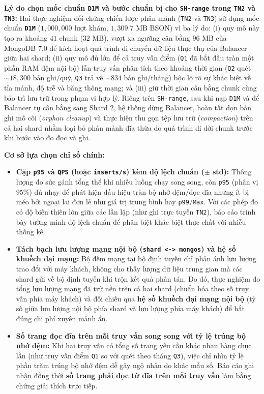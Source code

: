 \textbf{Lý do chọn mốc chuẩn \texttt{D1M} và bước chuẩn bị cho \texttt{SH-range} trong \texttt{TN2} và \texttt{TN3}:} Hai thực nghiệm đối chứng chiến lược phân mảnh (\texttt{TN2} và \texttt{TN3}) sử dụng mốc chuẩn \textbf{\texttt{D1M}} ($1{,}000{,}000$ lượt khám, $1{,}309.7\text{ MB}$ BSON) vì ba lý do: (i) quy mô này tạo ra khoảng $41$ chunk ($32\text{ MB}$), vượt xa ngưỡng cân bằng $96\text{ MB}$ của MongoDB 7.0 để kích hoạt quá trình di chuyển dữ liệu thực thụ của Balancer giữa hai shard; (ii) quy mô đủ lớn để cả truy vấn điểm (\texttt{Q1} đã bắt đầu tràn một phần RAM đệm nội bộ) lẫn truy vấn phân tích theo khoảng thời gian (\texttt{Q2} quét $\sim 18{,}300$ bản ghi/quý, \texttt{Q3} trả về $\sim 834$ bản ghi/tháng) bộc lộ rõ sự khác biệt về tỉa mảnh, độ trễ và băng thông mạng; và (iii) giữ thời gian cân bằng chunk cùng bảo trì lưu trữ trong phạm vi hợp lý. Riêng trên \texttt{SH-range}, sau khi nạp \texttt{D1M} và để Balancer tự cân bằng sang Shard 2, hệ thống dừng Balancer, hoàn tất dọn bản ghi mồ côi (\textit{orphan cleanup}) và thực hiện thu gọn tệp lưu trữ (\textit{compaction}) trên cả hai shard nhằm loại bỏ phân mảnh đĩa thừa do quá trình di dời chunk trước khi bước vào đo đọc và ghi.

\textbf{Cơ sở lựa chọn chỉ số chính:}
\begin{itemize}[leftmargin=0.8cm, itemsep=4pt]
  \item \textbf{Cặp \texttt{p95} và \texttt{QPS} (hoặc \texttt{inserts/s}) kèm độ lệch chuẩn ($\pm$ std):} Thông lượng đo sức gánh tổng thể khi nhiều luồng chạy song song, còn \texttt{p95} (phân vị $95\%$) đủ nhạy để phát hiện dấu hiệu tràn bộ nhớ đệm/đọc đĩa nhưng ít bị méo bởi ngoại lai đơn lẻ như giá trị trung bình hay \texttt{p99}/\texttt{Max}. Với các phép đo có độ biến thiên lớn giữa các lần lặp (như ghi trực tuyến \texttt{TN2}), báo cáo trình bày tường minh độ lệch chuẩn để phân biệt khác biệt thực chất với nhiễu thống kê.
  \item \textbf{Tách bạch lưu lượng mạng nội bộ (\texttt{shard <-> mongos}) và hệ số khuếch đại mạng:} Bộ đếm mạng tại bộ định tuyến chỉ phản ánh lưu lượng trao đổi với máy khách, không cho thấy lượng dữ liệu trung gian mà các shard gửi về bộ định tuyến khi trộn kết quả phân tán. Do đó, thực nghiệm đo tổng lưu lượng mạng đã trừ nền trên cả hai shard (chuẩn hóa theo số truy vấn phía máy khách) và đối chiếu qua \textbf{hệ số khuếch đại mạng nội bộ} (tỷ số giữa lưu lượng nội bộ phía shard và lưu lượng phía máy khách) để bắt đúng chi phí xuyên mảnh ẩn.
  \item \textbf{Số trang đọc đĩa trên mỗi truy vấn song song với tỷ lệ trúng bộ nhớ đệm:} Khi hai truy vấn có tổng số trang yêu cầu khác nhau hàng chục lần (như truy vấn điểm \texttt{Q1} so với quét theo tháng \texttt{Q3}), việc chỉ nhìn tỷ lệ phần trăm trúng bộ nhớ đệm dễ gây ngộ nhận do khác mẫu số. Báo cáo ghi nhận đồng thời \textbf{số trang phải đọc từ đĩa trên mỗi truy vấn} làm bằng chứng giải thích trực tiếp.
\end{itemize}
\FloatBarrier
